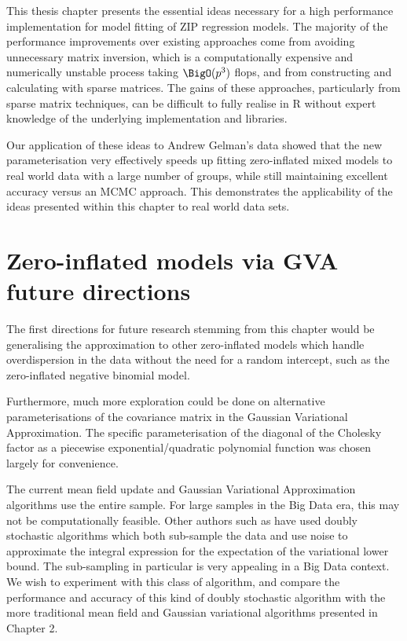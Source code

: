 This thesis chapter presents the essential ideas necessary for a high performance
implementation for model fitting of ZIP regression models.
The majority of the performance improvements over existing approaches come from
avoiding unnecessary matrix inversion, which is a computationally expensive
and numerically unstable process taking $\BigO(p^3)$ flops, and  from
constructing and calculating with sparse matrices. The gains of these
approaches, particularly from sparse  matrix techniques, can be difficult to
fully realise in R without expert knowledge of the underlying implementation
and libraries.
		
Our application of these ideas to Andrew Gelman's data showed that the new
parameterisation very effectively speeds up fitting zero-inflated mixed models
to real world data with a large number of groups, while still maintaining
excellent accuracy versus an MCMC approach. This demonstrates the applicability
of the ideas presented within this chapter to real world data sets.
\section{Zero-inflated models via GVA future directions}
		
The first directions for future research stemming from this chapter would be
generalising the approximation to other zero-inflated models which handle
overdispersion in the data without the need for a random intercept, such as the
zero-inflated negative binomial model.

Furthermore, much more exploration could be done on alternative
parameterisations of the covariance matrix in the Gaussian Variational
Approximation. The specific parameterisation of the diagonal of the Cholesky
factor as a piecewise exponential/quadratic polynomial function was chosen
largely for convenience.

The current mean field update and Gaussian Variational Approximation algorithms
use the entire sample. For large samples in the Big Data era, this may not be
computationally feasible. Other authors such as \cite{Tan2018} have used doubly
stochastic algorithms which both sub-sample the data and use noise to
approximate the integral expression for the expectation of the variational
lower bound. The sub-sampling in particular is very appealing in a Big Data
context. We wish to experiment with this class of algorithm, and compare the
performance and accuracy of this kind of doubly stochastic algorithm with the
more traditional mean field and Gaussian variational algorithms presented in
Chapter 2.

